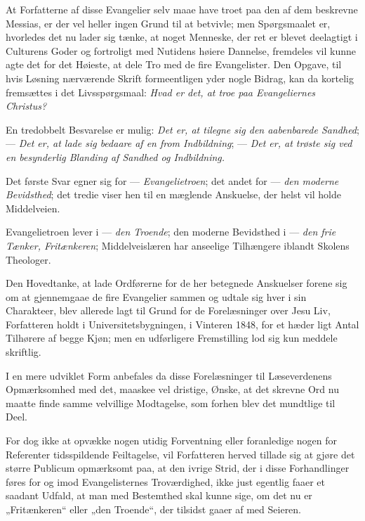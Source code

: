 \documentclass[12pt,a4paper]{book}
\begin{document}
At Forfatterne af disse Evangelier selv maae have troet paa den af dem
beskrevne Messias, er der vel heller ingen Grund til at betvivle; men
Spørgsmaalet er, hvorledes det nu lader sig tænke, at noget Menneske, der ret
er blevet deelagtigt i Culturens Goder og fortroligt med Nutidens høiere
Dannelse, fremdeles vil kunne agte det for det Høieste, at dele Tro med de
fire Evangelister.
Den Opgave, til hvis Løsning nærværende Skrift formeentligen yder nogle
Bidrag, kan da kortelig fremsættes i det Livsspørgsmaal: \emph{Hvad er det,
at troe paa Evangeliernes Christus?}

En tredobbelt Besvarelse er mulig: \emph{Det er, at tilegne sig den
aabenbarede Sandhed}; --- \emph{Det er, at lade sig bedaare af en from
Indbildning}; --- \emph{Det er, at trøste sig ved en besynderlig Blanding af
Sandhed og Indbildning.}

Det første Svar egner sig for --- \emph{Evangelietroen}; det andet for ---
\emph{den moderne Bevidsthed}; det tredie viser hen til en mæglende
Anskuelse, der helst vil holde Middelveien.

Evangelietroen lever i --- \emph{den Troende}; den moderne Bevidsthed i ---
\emph{den frie Tænker, Fritænkeren}; Middelveislæren har anseelige Tilhængere
iblandt Skolens Theologer.

Den Hovedtanke, at lade Ordførerne for de her betegnede Anskuelser forene sig
om at gjennemgaae de fire Evangelier sammen og udtale sig hver i sin
Charakteer, blev allerede lagt til Grund for de Forelæsninger over Jesu Liv,
Forfatteren holdt i Universitetsbygningen, i Vinteren 1848, for et hæder\-%
ligt Antal Tilhørere af begge Kjøn; men en udførligere Fremstilling lod sig
kun meddele skriftlig.

I en mere udviklet Form anbefales da disse Forelæsninger til Læseverdenens
Opmærksomhed med det, maaskee vel dristige, Ønske, at det skrevne Ord nu
maatte finde samme velvillige Modtagelse, som forhen blev det mundtlige til
Deel.

For dog ikke at opvække nogen utidig Forventning eller foranledige nogen for
Referenter tidsspildende Feiltagelse, vil Forfatteren herved tillade sig at
gjøre det større Publicum opmærksomt paa, at den ivrige Strid, der i disse
Forhandlinger føres for og imod Evangelisternes Troværdighed, ikke just
egentlig faaer et saadant Udfald, at man med Bestemthed skal kunne sige, om
det nu er „Fritænkeren“ eller „den Troende“, der tilsidst gaaer af med
Seieren.
\end{document}
